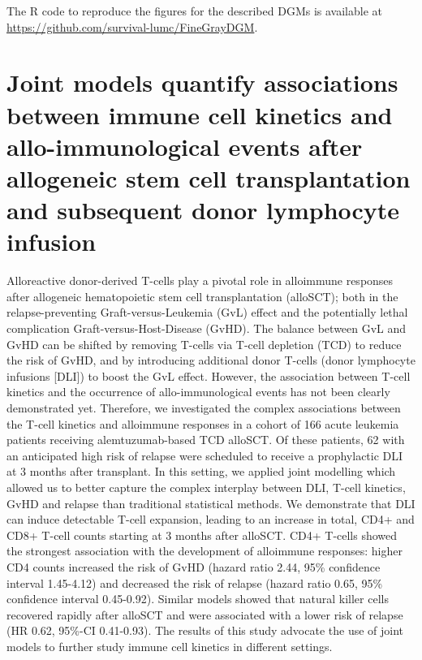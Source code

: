 \documentclass[
  letterpaper,
  DIV=11,
  numbers=noendperiod]{scrreprt}
\begin{document}

The R code to reproduce the figures for the described DGMs is available
at \url{https://github.com/survival-lumc/FineGrayDGM}.


\chapter{Joint models quantify associations between immune cell kinetics
and allo-immunological events after allogeneic stem cell transplantation
and subsequent donor lymphocyte infusion}\label{sec-chap-JM-DLI}

Alloreactive donor-derived T-cells play a pivotal role in alloimmune
responses after allogeneic hematopoietic stem cell transplantation
(alloSCT); both in the relapse-preventing Graft-versus-Leukemia (GvL)
effect and the potentially lethal complication Graft-versus-Host-Disease
(GvHD). The balance between GvL and GvHD can be shifted by removing
T-cells via T-cell depletion (TCD) to reduce the risk of GvHD, and by
introducing additional donor T-cells (donor lymphocyte infusions
{[}DLI{]}) to boost the GvL effect. However, the association between
T-cell kinetics and the occurrence of allo-immunological events has not
been clearly demonstrated yet. Therefore, we investigated the complex
associations between the T-cell kinetics and alloimmune responses in a
cohort of 166 acute leukemia patients receiving alemtuzumab-based TCD
alloSCT. Of these patients, 62 with an anticipated high risk of relapse
were scheduled to receive a prophylactic DLI at 3 months after
transplant. In this setting, we applied joint modelling which allowed us
to better capture the complex interplay between DLI, T-cell kinetics,
GvHD and relapse than traditional statistical methods. We demonstrate
that DLI can induce detectable T-cell expansion, leading to an increase
in total, CD4+ and CD8+ T-cell counts starting at 3 months after
alloSCT. CD4+ T-cells showed the strongest association with the
development of alloimmune responses: higher CD4 counts increased the
risk of GvHD (hazard ratio 2.44, 95\% confidence interval 1.45-4.12) and
decreased the risk of relapse (hazard ratio 0.65, 95\% confidence
interval 0.45-0.92). Similar models showed that natural killer cells
recovered rapidly after alloSCT and were associated with a lower risk of
relapse (HR 0.62, 95\%-CI 0.41-0.93). The results of this study advocate
the use of joint models to further study immune cell kinetics in
different settings.
\end{document}
